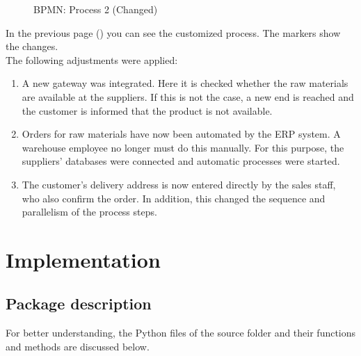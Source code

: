     \begin{figure}[H]
        \centering
        \caption{BPMN: Process 2 (Changed)}
        \label{bpmn2}
    \end{figure}
    In the previous page (\pageref{bpmn2}) you can see the customized process. The markers show the changes.\\
    The following adjustments were applied:
    \begin{enumerate}
        \item A new gateway was integrated. Here it is checked whether the raw materials are available at the suppliers. If this is not the case, a new end is reached and the customer is informed that the product is not available.
        \item Orders for raw materials have now been automated by the ERP system. A warehouse employee no longer must do this manually. For this purpose, the suppliers' databases were connected and automatic processes were started.
        \item The customer's delivery address is now entered directly by the sales staff, who also confirm the order. In addition, this changed the sequence and parallelism of the process steps.
    \end{enumerate}
\clearpage
\chapter{Implementation}

    \section{Package description}
    For better understanding, the Python files of the source folder and their functions and methods are discussed below.

